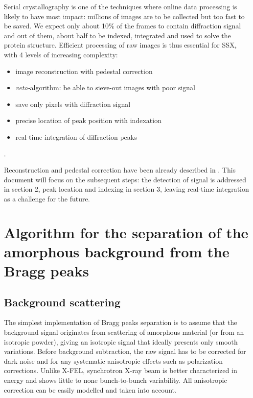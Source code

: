 \documentclass[preprint]{iucr}              %
\begin{document}
Serial crystallography is one of the techniques where online data processing is likely to have most impact:
millions of images are to be collected but too fast to be saved. 
We expect only about 10\% of the frames to contain diffraction signal and out of them, about half to be indexed, integrated and used to solve the protein structure.
Efficient processing of raw images is thus essential for SSX, with 4 levels of increasing complexity:
\begin{itemize}
    \item image reconstruction with pedestal correction
    \item \textit{veto-}algorithm: be able to sieve-out images with poor signal
    \item save only pixels with diffraction signal
    \item precise location of peak position with indexation \cite{toro}
    \item real-time integration of diffraction peaks
\end{itemize}.

Reconstruction and pedestal correction have been already described in .
This document will focus on the subsequent steps: the detection of signal is addressed in section 2, peak location and indexing in section 3, leaving real-time integration as a challenge for the future.





\section{Algorithm for the separation of the amorphous background from the Bragg peaks}
\subsection{Background scattering}
The simplest implementation of Bragg peaks separation is to assume that the background signal originates from scattering of amorphous material (or from an isotropic powder), giving an isotropic signal that ideally presents only smooth variations.
Before background subtraction, the raw signal has to be corrected for dark noise and for any systematic anisotropic effects such as polarization corrections.
Unlike X-FEL, synchrotron X-ray beam is better characterized in energy and shows little to none bunch-to-bunch variability.
All anisotropic correction can be easily modelled and taken into account.
\end{document}
